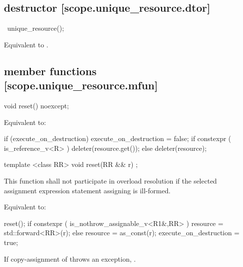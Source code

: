 \documentclass[ebook,11pt,article]{memoir}
\begin{document}
\subsection { destructor [scope.unique_resource.dtor]}

\begin{itemdecl}
~unique_resource();
\end{itemdecl}

\begin{itemdescr}
\pnum
\effects 
Equivalent to .
\end{itemdescr}

\subsection { member functions [scope.unique_resource.mfun]}

\begin{itemdecl}
void reset() noexcept;
\end{itemdecl}

\begin{itemdescr}
\pnum
\effects
Equivalent to:
\begin{codeblock}
if (execute_on_destruction) {
    execute_on_destruction = false;
    if constexpr ( is_reference_v<R> ) 
        deleter(resource.get());
    else 
        deleter(resource);
}
\end{codeblock}
\end{itemdescr}

\begin{itemdecl}
template <class RR>
void reset(RR && r) ;
\end{itemdecl}

\begin{itemdescr}
\pnum
\remarks This function  shall not participate in overload resolution if the selected assignment expression statement assigning  is ill-formed.

\pnum
\effects 
Equivalent to:
\begin{codeblock}
reset();
if constexpr ( is_nothrow_assignable_v<R1&,RR> )
    resource = std::forward<RR>(r);
else
    resource = as_const(r);
execute_on_destruction = true;
\end{codeblock}

If copy-assignment of  throws an exception, .
\end{itemdescr}
\end{document}
